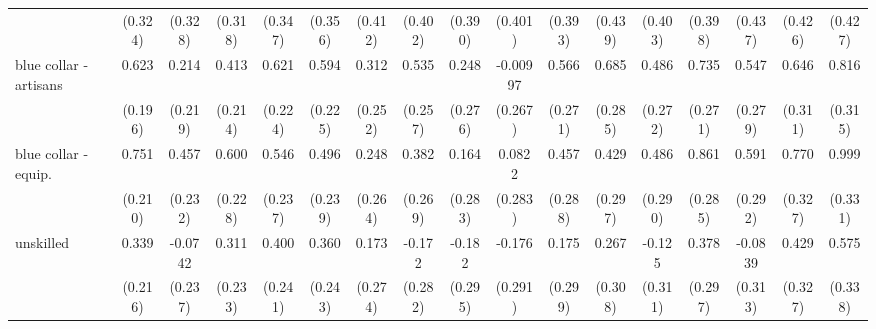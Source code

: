 {\begin{tabular}{l*{16}{c}}
                    &     (0.324)         &     (0.328)         &     (0.318)         &     (0.347)         &     (0.356)         &     (0.412)         &     (0.402)         &     (0.390)         &     (0.401)         &     (0.393)         &     (0.439)         &     (0.403)         &     (0.398)         &     (0.437)         &     (0.426)         &     (0.427)         \\
[1em]
blue collar - artisans&       0.623\sym{**} &       0.214         &       0.413         &       0.621\sym{**} &       0.594\sym{**} &       0.312         &       0.535\sym{*}  &       0.248         &    -0.00997         &       0.566\sym{*}  &       0.685\sym{*}  &       0.486         &       0.735\sym{**} &       0.547         &       0.646\sym{*}  &       0.816\sym{**} \\
                    &     (0.196)         &     (0.219)         &     (0.214)         &     (0.224)         &     (0.225)         &     (0.252)         &     (0.257)         &     (0.276)         &     (0.267)         &     (0.271)         &     (0.285)         &     (0.272)         &     (0.271)         &     (0.279)         &     (0.311)         &     (0.315)         \\
[1em]
blue collar - equip.&       0.751\sym{***}&       0.457\sym{*}  &       0.600\sym{**} &       0.546\sym{*}  &       0.496\sym{*}  &       0.248         &       0.382         &       0.164         &      0.0822         &       0.457         &       0.429         &       0.486         &       0.861\sym{**} &       0.591\sym{*}  &       0.770\sym{*}  &       0.999\sym{**} \\
                    &     (0.210)         &     (0.232)         &     (0.228)         &     (0.237)         &     (0.239)         &     (0.264)         &     (0.269)         &     (0.283)         &     (0.283)         &     (0.288)         &     (0.297)         &     (0.290)         &     (0.285)         &     (0.292)         &     (0.327)         &     (0.331)         \\
[1em]
unskilled           &       0.339         &     -0.0742         &       0.311         &       0.400         &       0.360         &       0.173         &      -0.172         &      -0.182         &      -0.176         &       0.175         &       0.267         &      -0.125         &       0.378         &     -0.0839         &       0.429         &       0.575         \\
                    &     (0.216)         &     (0.237)         &     (0.233)         &     (0.241)         &     (0.243)         &     (0.274)         &     (0.282)         &     (0.295)         &     (0.291)         &     (0.299)         &     (0.308)         &     (0.311)         &     (0.297)         &     (0.313)         &     (0.327)         &     (0.338)         \\

\end{tabular}}
